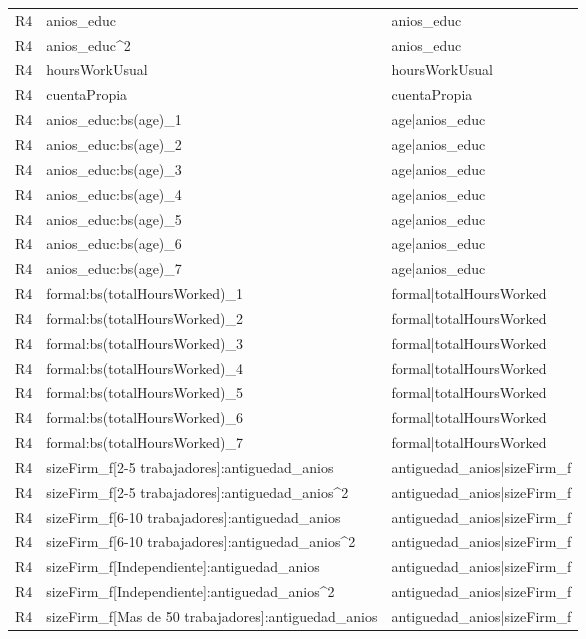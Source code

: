 \begin{longtable}{lll}
R4 & anios\_educ & anios\_educ \\
R4 & anios\_educ\textasciicircum 2 & anios\_educ \\
R4 & hoursWorkUsual & hoursWorkUsual \\
R4 & cuentaPropia & cuentaPropia \\
R4 & anios\_educ:bs(age)\_1 & age|anios\_educ \\
R4 & anios\_educ:bs(age)\_2 & age|anios\_educ \\
R4 & anios\_educ:bs(age)\_3 & age|anios\_educ \\
R4 & anios\_educ:bs(age)\_4 & age|anios\_educ \\
R4 & anios\_educ:bs(age)\_5 & age|anios\_educ \\
R4 & anios\_educ:bs(age)\_6 & age|anios\_educ \\
R4 & anios\_educ:bs(age)\_7 & age|anios\_educ \\
R4 & formal:bs(totalHoursWorked)\_1 & formal|totalHoursWorked \\
R4 & formal:bs(totalHoursWorked)\_2 & formal|totalHoursWorked \\
R4 & formal:bs(totalHoursWorked)\_3 & formal|totalHoursWorked \\
R4 & formal:bs(totalHoursWorked)\_4 & formal|totalHoursWorked \\
R4 & formal:bs(totalHoursWorked)\_5 & formal|totalHoursWorked \\
R4 & formal:bs(totalHoursWorked)\_6 & formal|totalHoursWorked \\
R4 & formal:bs(totalHoursWorked)\_7 & formal|totalHoursWorked \\
R4 & sizeFirm\_f[2-5 trabajadores]:antiguedad\_anios & antiguedad\_anios|sizeFirm\_f \\
R4 & sizeFirm\_f[2-5 trabajadores]:antiguedad\_anios\textasciicircum 2 & antiguedad\_anios|sizeFirm\_f \\
R4 & sizeFirm\_f[6-10 trabajadores]:antiguedad\_anios & antiguedad\_anios|sizeFirm\_f \\
R4 & sizeFirm\_f[6-10 trabajadores]:antiguedad\_anios\textasciicircum 2 & antiguedad\_anios|sizeFirm\_f \\
R4 & sizeFirm\_f[Independiente]:antiguedad\_anios & antiguedad\_anios|sizeFirm\_f \\
R4 & sizeFirm\_f[Independiente]:antiguedad\_anios\textasciicircum 2 & antiguedad\_anios|sizeFirm\_f \\
R4 & sizeFirm\_f[Mas de 50 trabajadores]:antiguedad\_anios & antiguedad\_anios|sizeFirm\_f \\

\end{longtable}
